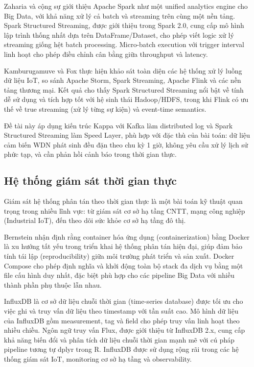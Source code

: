 Zaharia và cộng sự \cite{zaharia2016spark} giới thiệu Apache Spark như một unified
analytics engine cho Big Data, với khả năng xử lý cả batch và streaming trên cùng
một nền tảng. Spark Structured Streaming, được giới thiệu trong Spark 2.0, cung
cấp mô hình lập trình thống nhất dựa trên DataFrame/Dataset, cho phép viết logic
xử lý streaming giống hệt batch processing. Micro-batch execution với trigger
interval linh hoạt cho phép điều chỉnh cân bằng giữa throughput và latency.

Kamburugamuve và Fox \cite{kamburugamuve2016survey} thực hiện khảo sát toàn diện
các hệ thống xử lý luồng dữ liệu IoT, so sánh Apache Storm, Spark Streaming,
Apache Flink và các nền tảng thương mại. Kết quả cho thấy Spark Structured Streaming
nổi bật về tính dễ sử dụng và tích hợp tốt với hệ sinh thái Hadoop/HDFS, trong khi
Flink có ưu thế về true streaming (xử lý từng sự kiện) và event-time semantics.

Đề tài này áp dụng kiến trúc Kappa với Kafka làm distributed log và Spark Structured
Streaming làm Speed Layer, phù hợp với đặc thù của bài toán: dữ liệu cảm biến WDN
phát sinh đều đặn theo chu kỳ 1 giờ, không yêu cầu xử lý lịch sử phức tạp, và cần
phản hồi cảnh báo trong thời gian thực.

\subsection{Hệ thống giám sát thời gian thực}

Giám sát hệ thống phân tán theo thời gian thực là một bài toán kỹ thuật quan trọng
trong nhiều lĩnh vực: từ giám sát cơ sở hạ tầng CNTT, mạng công nghiệp
(Industrial IoT), đến theo dõi sức khỏe cơ sở hạ tầng đô thị.

Bernstein \cite{bernstein2014containers} nhận định rằng container hóa ứng dụng
(containerization) bằng Docker là xu hướng tất yếu trong triển khai hệ thống phân
tán hiện đại, giúp đảm bảo tính tái lập (reproducibility) giữa môi trường phát
triển và sản xuất. Docker Compose cho phép định nghĩa và khởi động toàn bộ stack
đa dịch vụ bằng một file cấu hình duy nhất, đặc biệt phù hợp cho các pipeline
Big Data với nhiều thành phần phụ thuộc lẫn nhau.

InfluxDB \cite{influxdata2024influxdb} là cơ sở dữ liệu chuỗi thời gian
(time-series database) được tối ưu cho việc ghi và truy vấn dữ liệu theo timestamp
với tần suất cao. Mô hình dữ liệu của InfluxDB gồm measurement, tag và field cho
phép truy vấn linh hoạt theo nhiều chiều. Ngôn ngữ truy vấn Flux, được giới thiệu
từ InfluxDB 2.x, cung cấp khả năng biến đổi và phân tích dữ liệu chuỗi thời gian
mạnh mẽ với cú pháp pipeline tương tự dplyr trong R. InfluxDB được sử dụng rộng
rãi trong các hệ thống giám sát IoT, monitoring cơ sở hạ tầng và observability.

